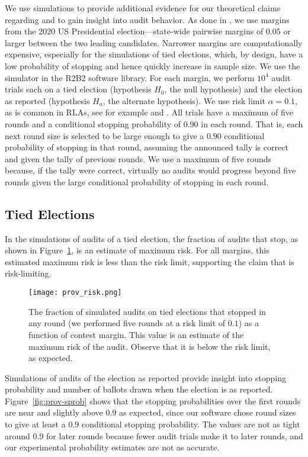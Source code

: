 We use simulations to provide additional evidence for our theoretical claims regarding \Providence and to gain insight into audit behavior. As done in \cite{simulations}, we use margins from the 2020 US Presidential election---state-wide pairwise margins of $0.05$ or larger between the two leading candidates. Narrower margins are computationally expensive, especially for the simulations of tied elections, which, by design, have a low probability of stopping and hence quickly increase in sample size. We use the simulator in the R2B2 software library\cite{r2b2_anon}. For each margin, we perform $10^4$ \Providence audit trials each on a tied election (hypothesis $H_0$, the null hypothesis) and the election as reported (hypothesis $H_a$, the alternate hypothesis). We use risk limit $\alpha = 0.1$, as is common in RLAs, see for example \cite{va-2022} and \cite{RI-report}. All trials have a maximum of five rounds and a conditional stopping probability of $0.90$ in each round. That is, each next round size is selected to be large enough to give a $0.90$ conditional probability of stopping in that round, assuming the announced tally is correct and given the tally of previous rounds. We use a maximum of five rounds because, if the tally were correct, virtually no audits would progress beyond five rounds given the large conditional probability of stopping in each round. 

\subsection{Tied Elections}
In the simulations of \Providence audits of a tied election, the fraction of audits that stop, as shown in Figure~\ref{fig:prov-risk}, is an estimate of maximum risk. For all margins, this estimated maximum risk is less than the risk limit, supporting the claim that \Providence is risk-limiting.

\begin{figure}[h!]
\texttt{[image: prov\_risk.png]}
\caption{The fraction of simulated \Providence audits on tied elections that stopped in any round (we performed five rounds at a risk limit of $0.1$) as a function of contest margin. This value is an estimate of the maximum risk of the \Providence audit. Observe that it is below the risk limit, as expected.}
\label{fig:prov-risk}
\end{figure}

Simulations of audits of the election as reported provide insight into stopping probability and number of ballots drawn when the election is as reported. Figure~\ref{fig:prov-sprob} shows that the stopping probabilities over the first rounds are near and slightly above $0.9$ as expected, since our software chose round sizes to give at least a $0.9$ conditional stopping probability. The values are not as tight around $0.9$ for later rounds because fewer audit trials make it to later rounds, and our experimental probability estimates are not as accurate. 

